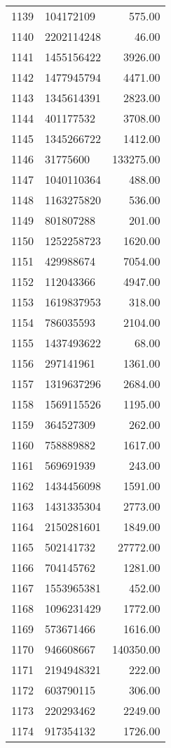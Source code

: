 \begin{table}[ht]
\begin{tabular}{rlr}
  1139 & 104172109 & 575.00 \\ 
  1140 & 2202114248 & 46.00 \\ 
  1141 & 1455156422 & 3926.00 \\ 
  1142 & 1477945794 & 4471.00 \\ 
  1143 & 1345614391 & 2823.00 \\ 
  1144 & 401177532 & 3708.00 \\ 
  1145 & 1345266722 & 1412.00 \\ 
  1146 & 31775600 & 133275.00 \\ 
  1147 & 1040110364 & 488.00 \\ 
  1148 & 1163275820 & 536.00 \\ 
  1149 & 801807288 & 201.00 \\ 
  1150 & 1252258723 & 1620.00 \\ 
  1151 & 429988674 & 7054.00 \\ 
  1152 & 112043366 & 4947.00 \\ 
  1153 & 1619837953 & 318.00 \\ 
  1154 & 786035593 & 2104.00 \\ 
  1155 & 1437493622 & 68.00 \\ 
  1156 & 297141961 & 1361.00 \\ 
  1157 & 1319637296 & 2684.00 \\ 
  1158 & 1569115526 & 1195.00 \\ 
  1159 & 364527309 & 262.00 \\ 
  1160 & 758889882 & 1617.00 \\ 
  1161 & 569691939 & 243.00 \\ 
  1162 & 1434456098 & 1591.00 \\ 
  1163 & 1431335304 & 2773.00 \\ 
  1164 & 2150281601 & 1849.00 \\ 
  1165 & 502141732 & 27772.00 \\ 
  1166 & 704145762 & 1281.00 \\ 
  1167 & 1553965381 & 452.00 \\ 
  1168 & 1096231429 & 1772.00 \\ 
  1169 & 573671466 & 1616.00 \\ 
  1170 & 946608667 & 140350.00 \\ 
  1171 & 2194948321 & 222.00 \\ 
  1172 & 603790115 & 306.00 \\ 
  1173 & 220293462 & 2249.00 \\ 
  1174 & 917354132 & 1726.00 \\ 

\end{tabular}
\end{table}

